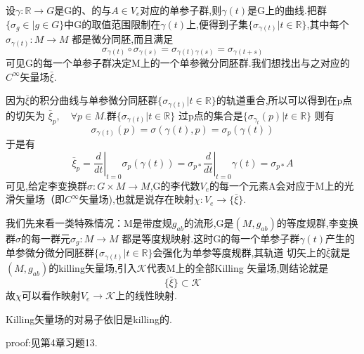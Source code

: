 \documentclass[../main.tex]{subfiles}
\begin{document}
设$\gamma:\mathbb{R}\longrightarrow G$是G的、的与$A\in V_e$对应的单参子群,则$\gamma(t)$是G上的曲线.把群$\{\sigma_g \in |g\in G\}$中G的取值范围限制在$\gamma(t)$上,便得到子集$\{\sigma_{\gamma(t)}|t\in \mathbb{R}\}$,其中每个$\sigma_{\gamma(t)}: M\rightarrow M$
都是微分同胚,而且满足\[
	\sigma_{\gamma(t)}\circ \sigma_{\gamma(s)} = \sigma_{\gamma(t)\gamma(s)} = \sigma_{\gamma(t+s)}
\]可见G的每一个单参子群决定M上的一个单参微分同胚群.我们想找出与之对应的$C^\infty$矢量场$\bar{\xi}$.

因为$\bar{\xi}$的积分曲线与单参微分同胚群$\{\sigma_{\gamma(t)}| t \in \mathbb{R}\}$的轨道重合,所以可以得到在p点的切矢为
$\bar{\xi}_p,\quad \forall p \in M$.群$\{\sigma_{\gamma(t)}|t \in \mathbb{R}\}$ 过p点的集合是$\{\sigma_{\gamma_t}(p)|t\in \mathbb{R}\}$
则有\[
	\sigma_{\gamma(t)}(p) = \sigma(\gamma(t),p) = \sigma_p(\gamma(t))
\]于是有\[
	\bar{\xi}_p = \left.\dfrac{d}{dt}\right|_{t = 0} \sigma_p(\gamma(t)) = \sigma_{p*}\left.\dfrac{d}{dt}\right|_{t = 0} \gamma(t) = \sigma_{p*}A
\]
可见,给定李变换群$\sigma: G\times M\rightarrow M $,G的李代数$V_e$的每一个元素A会对应于M上的光滑矢量场（即$C^\infty$矢量场),也就是说存在映射$\chi:V_e \rightarrow \{\bar{\xi}\}$.

我们先来看一类特殊情况：M是带度规$g_{ab}$的流形,G是$(M,g_{ab})$的等度规群,李变换群$\sigma$的每一群元$\sigma_g : M\rightarrow M $
都是等度规映射.这时G的每一个单参子群$\gamma(t)$产生的单参微分微分同胚群$\{\sigma_{\gamma(t)}|t\in \mathbb{R}\}$会强化为单参等度规群,其轨道
切矢上的$\bar{\xi}$就是$(M,g_{ab})$的killing矢量场,引入$\mathscr{K}$代表M上的全部Killing
矢量场,则结论就是$$
	\{\bar{\xi}\} \subset \mathscr{K}$$
故$\chi$可以看作映射$V_e \rightarrow \mathscr{K}$上的线性映射.
\begin{lemma}
	Killing矢量场的对易子依旧是killing的.
\end{lemma}
proof:见第4章习题13.
\end{document}
